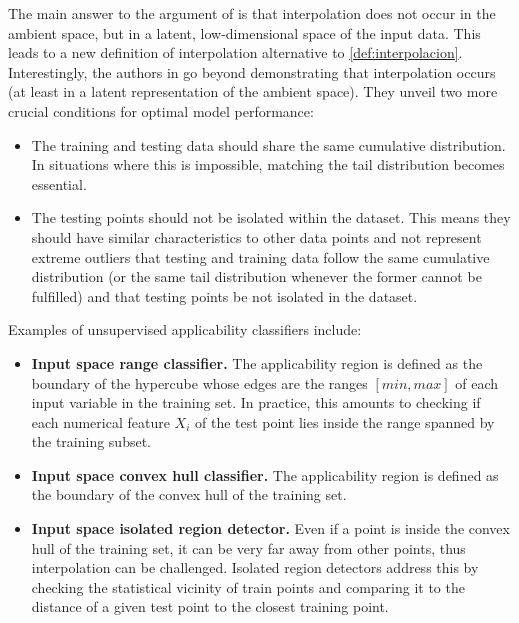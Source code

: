 \indent The main answer to the argument of \cite{balestriero2021learning} is that interpolation does not occur in the ambient space, but in a latent, low-dimensional space of the input data\cite{bonnasse2022interpolation}. This leads to a new definition of interpolation alternative to \autoref{def:interpolacion}.\\
%
\indent Interestingly, the authors in \cite{bonnasse2022interpolation} go beyond demonstrating that interpolation occurs (at least in a latent representation of the ambient space). They unveil two more crucial conditions for optimal model performance:
%
\begin{itemize}
	\item The training and testing data should share the same cumulative distribution. In situations where this is impossible, matching the tail distribution becomes essential.
	\item The testing points should not be isolated within the dataset. This means they should have similar characteristics to other data points and not represent extreme outliers that testing and training data follow the same cumulative distribution (or the same tail distribution whenever the former cannot be fulfilled) and that testing points be not isolated in the dataset.\\
\end{itemize}
%
Examples of unsupervised applicability classifiers include:
\begin{itemize}
	\item \textbf{Input space range classifier.} The applicability region is defined as the boundary of the hypercube whose edges are the ranges $[min, max]$ of each input variable in the training set. In practice, this amounts to checking if each numerical feature $X_i$ of the test point lies inside the range spanned by the training subset.
	\item \textbf{Input space convex hull classifier.} The applicability region is defined as the boundary of the convex hull of the training set.
	\item \textbf{Input space isolated region detector.} Even if a point is inside the convex hull of the training set, it can be very far away from other points, thus interpolation can be challenged. Isolated region detectors address this by checking the statistical vicinity of train points and comparing it to the distance of a given test point to the closest training point.\\
\end{itemize}

